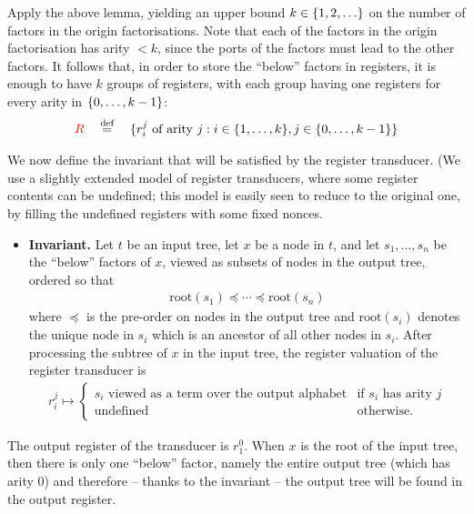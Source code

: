 Apply the above lemma, yielding an upper bound  $k \in \{1,2,\ldots\}$ on the number of factors in the origin factorisations.
Note that each of the factors in the origin factorisation has arity  $<k$, since the ports of the factors must lead to the other factors. It follows that, in order to store the ``below'' factors in registers, it is enough to have  $k$ groups of registers, with each group having one registers for every arity in $\{0,\ldots,k-1\}$:
\newcommand{\sttregval}[2]{\text{{(register valuation of $#1$ in $#2$)}}}
\newcommand{\rootnode}[1]{\mathrm{root}(#1)}
\begin{align*}
{{\color{red}{R}}} \quad \stackrel{\text{def}}= \quad \{r_i^j \text{ of arity $j$} : i \in \{1,\ldots,k\}, j \in \{0,\ldots,k-1\}\} 
\end{align*}

We now define the invariant that will be satisfied by the register transducer. (We use a slightly extended model of register transducers, where some register contents can be undefined; this model is easily seen to reduce to the original one, by filling the undefined registers with  some fixed nonces. 
\begin{itemize}
    \item {\bf Invariant.} Let $t$ be an input tree,  let $x$ be a node in $t$, and let $s_1,\ldots,s_n$ be the ``below'' factors of $x$, viewed as subsets of nodes in the output tree, ordered so that 
    \begin{align*}
       \rootnode{s_1} \preceq  \cdots \preceq \rootnode{s_n} 
    \end{align*}
    where $\preceq$ is the pre-order on nodes in the output tree and $\rootnode{s_i}$ denotes the  unique node in $s_i$ which is an ancestor of all other nodes in $s_i$. After processing the subtree of $x$ in the input tree, the register valuation of the register transducer is 
    \begin{align*}
        r_i^j  \mapsto \begin{cases}
            \text{$s_i$ viewed as a term over the output alphabet} & \text{if $s_i$ has arity $j$}\\
            \text{undefined} & \text{otherwise}.
        \end{cases}
    \end{align*}
\end{itemize}


The output register of the transducer is $r_1^0$. When $x$ is the root of the input tree, then there is only one ``below'' factor, namely the entire output tree (which has arity $0$) and therefore -- thanks to the invariant -- the output tree will be found in the output register. 

